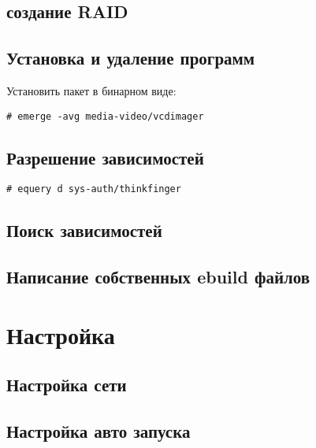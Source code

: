 \documentclass[10pt, a4paper]{article}
\begin{document}
\subsection{создание RAID}

\subsection{Установка и удаление программ}

Установить пакет в бинарном виде:

\begin{verbatim}
# emerge -avg media-video/vcdimager
\end{verbatim}

\subsection{Разрешение зависимостей}

\begin{verbatim}
# equery d sys-auth/thinkfinger
\end{verbatim}

\subsection{Поиск зависимостей}

\subsection{Написание собственных ebuild файлов}

\newpage
\section{Настройка}

\subsection{Настройка сети}

\subsection{Настройка авто запуска}
\end{document}
